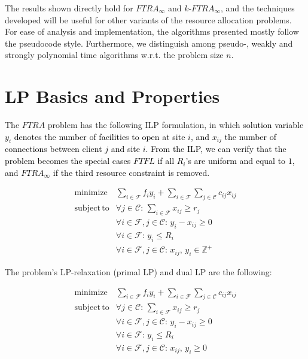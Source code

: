 \documentclass[10pt]{llncs}
\begin{document}
The results shown directly hold for $FTRA_{\infty}$ and $ $$k$-$FTRA_{\infty}$,
and the techniques developed will be useful for other variants of
the resource allocation problems. For ease of analysis and implementation,
the algorithms presented mostly follow the pseudocode style. Furthermore,
we distinguish among pseudo-, weakly and strongly polynomial time
algorithms w.r.t. the problem size $n$.


\section{LP Basics and Properties}

The $FTRA$ problem has the following ILP formulation, in which \textcolor{black}{solution
variable $y_{i}$ denotes the number of facilities to open at site
$i$, and $x_{ij}$ the number of connections between client $j$
and site $i$. From the ILP, we can verify that the problem becomes
the special cases $FTFL$ if all $R_{i}$'s are uniform and equal
to $1$, and $FTRA_{\infty}$ if the third resource constraint is
removed.} 

\textit{\small 
\begin{equation}
\begin{array}{llc}
\mathrm{minimize} & \sum_{i\in\mathcal{F}}f_{i}y_{i}+\sum_{i\in\mathcal{F}}\sum_{j\in\mathcal{C}}c_{ij}x_{ij}\\
\mathrm{subject\, to} & \forall j\in\mathcal{C}:\,\sum_{i\in\mathcal{F}}x_{ij}\ge r_{j}\\
 & \forall i\in\mathcal{F},j\in\mathcal{C}:\, y_{i}-x_{ij}\geq0\\
 & \forall i\in\mathcal{F}:\, y_{i}\leq R_{i}\\
 & \forall i\in\mathcal{F},j\in\mathcal{C}:\, x_{ij},\, y_{i}\in\mathbb{Z}^{+}
\end{array}\label{eq:ftra-ip}
\end{equation}
}{\small \par}

The problem's LP-relaxation (primal LP) and dual LP are the following:

\textit{\small 
\begin{equation}
\begin{array}{llc}
\mathrm{minimize} & \sum_{i\in\mathcal{F}}f_{i}y_{i}+\sum_{i\in\mathcal{F}}\sum_{j\in\mathcal{C}}c_{ij}x_{ij}\\
\mathrm{subject\, to} & \forall j\in\mathcal{C}:\,\sum_{i\in\mathcal{F}}x_{ij}\ge r_{j}\\
 & \forall i\in\mathcal{F},j\in\mathcal{C}:\, y_{i}-x_{ij}\geq0\\
 & \forall i\in\mathcal{F}:\, y_{i}\leq R_{i}\\
 & \forall i\in\mathcal{F},j\in\mathcal{C}:\, x_{ij},\, y_{i}\geq0
\end{array}\label{eq:ftra-lp}
\end{equation}
}{\small \par}
\end{document}
